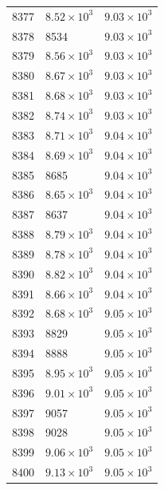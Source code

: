 \begin{table}[H]
\begin{tabular}{lll}
8377 & $\displaystyle 8.52 \times 10^{3}$ & $\displaystyle 9.03 \times 10^{3}$ \\
8378 & 8534 & $\displaystyle 9.03 \times 10^{3}$ \\
8379 & $\displaystyle 8.56 \times 10^{3}$ & $\displaystyle 9.03 \times 10^{3}$ \\
8380 & $\displaystyle 8.67 \times 10^{3}$ & $\displaystyle 9.03 \times 10^{3}$ \\
8381 & $\displaystyle 8.68 \times 10^{3}$ & $\displaystyle 9.03 \times 10^{3}$ \\
8382 & $\displaystyle 8.74 \times 10^{3}$ & $\displaystyle 9.03 \times 10^{3}$ \\
8383 & $\displaystyle 8.71 \times 10^{3}$ & $\displaystyle 9.04 \times 10^{3}$ \\
8384 & $\displaystyle 8.69 \times 10^{3}$ & $\displaystyle 9.04 \times 10^{3}$ \\
8385 & 8685 & $\displaystyle 9.04 \times 10^{3}$ \\
8386 & $\displaystyle 8.65 \times 10^{3}$ & $\displaystyle 9.04 \times 10^{3}$ \\
8387 & 8637 & $\displaystyle 9.04 \times 10^{3}$ \\
8388 & $\displaystyle 8.79 \times 10^{3}$ & $\displaystyle 9.04 \times 10^{3}$ \\
8389 & $\displaystyle 8.78 \times 10^{3}$ & $\displaystyle 9.04 \times 10^{3}$ \\
8390 & $\displaystyle 8.82 \times 10^{3}$ & $\displaystyle 9.04 \times 10^{3}$ \\
8391 & $\displaystyle 8.66 \times 10^{3}$ & $\displaystyle 9.04 \times 10^{3}$ \\
8392 & $\displaystyle 8.68 \times 10^{3}$ & $\displaystyle 9.05 \times 10^{3}$ \\
8393 & 8829 & $\displaystyle 9.05 \times 10^{3}$ \\
8394 & 8888 & $\displaystyle 9.05 \times 10^{3}$ \\
8395 & $\displaystyle 8.95 \times 10^{3}$ & $\displaystyle 9.05 \times 10^{3}$ \\
8396 & $\displaystyle 9.01 \times 10^{3}$ & $\displaystyle 9.05 \times 10^{3}$ \\
8397 & 9057 & $\displaystyle 9.05 \times 10^{3}$ \\
8398 & 9028 & $\displaystyle 9.05 \times 10^{3}$ \\
8399 & $\displaystyle 9.06 \times 10^{3}$ & $\displaystyle 9.05 \times 10^{3}$ \\
8400 & $\displaystyle 9.13 \times 10^{3}$ & $\displaystyle 9.05 \times 10^{3}$ \\

\end{tabular}
\end{table}
